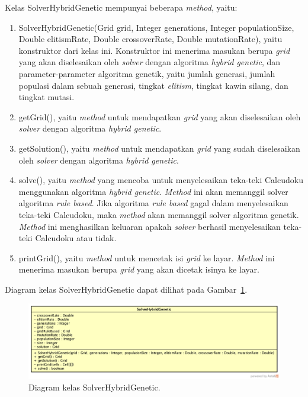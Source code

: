 Kelas SolverHybridGenetic mempunyai beberapa \textit{method}, yaitu:

\begin{enumerate}
\item SolverHybridGenetic(Grid grid,  Integer generations, Integer populationSize, Double elitismRate, Double crossoverRate, Double mutationRate), yaitu konstruktor dari kelas ini. Konstruktor ini menerima masukan berupa \textit{grid} yang akan diselesaikan oleh \textit{solver} dengan algoritma \textit{hybrid genetic}, dan parameter-parameter algoritma genetik, yaitu jumlah generasi, jumlah populasi dalam sebuah generasi, tingkat \textit{elitism}, tingkat kawin silang, dan tingkat mutasi.
\item getGrid(), yaitu \textit{method} untuk mendapatkan \textit{grid} yang akan diselesaikan oleh \textit{solver} dengan algoritma \textit{hybrid genetic}.
\item getSolution(), yaitu \textit{method} untuk mendapatkan \textit{grid} yang sudah diselesaikan oleh \textit{solver} dengan algoritma \textit{hybrid genetic}.
\item solve(), yaitu \textit{method} yang mencoba untuk menyelesaikan teka-teki Calcudoku menggunakan algoritma \textit{hybrid genetic}. \textit{Method} ini akan memanggil solver algoritma \textit{rule based}. Jika algoritma \textit{rule based} gagal dalam menyelesaikan teka-teki Calcudoku, maka \textit{method} akan memanggil solver algoritma genetik. \textit{Method} ini menghasilkan keluaran apakah \textit{solver} berhasil menyelesaikan teka-teki Calcudoku atau tidak.
\item printGrid(), yaitu \textit{method} untuk mencetak isi \textit{grid} ke layar. \textit{Method} ini menerima masukan berupa \textit{grid} yang akan dicetak isinya ke layar.

\end{enumerate}

Diagram kelas SolverHybridGenetic dapat dilihat pada Gambar~\ref{fig:diagramkelassolverhg}.

\begin{figure}
\centering
\captionsetup{justification=centering}
\includegraphics[scale=0.3]{Gambar/Perancangan/DiagramKelasSolverHybridGenetic.png}
\caption[Diagram kelas SolverHybridGenetic.]{Diagram kelas SolverHybridGenetic.}
\label{fig:diagramkelassolverhg}
\end{figure}

